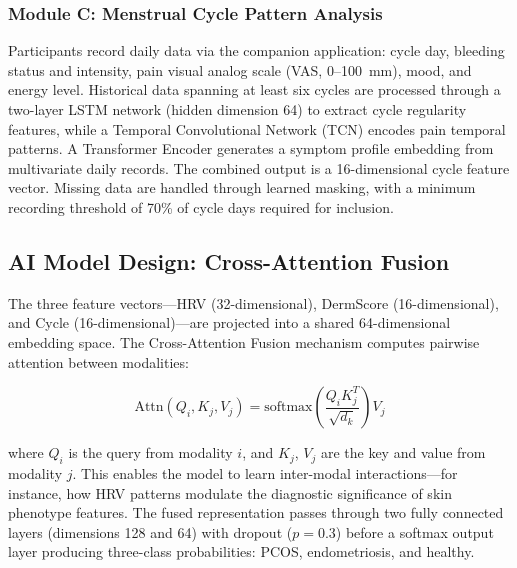 \documentclass[conference]{IEEEtran}
\begin{document}
\subsubsection{Module C: Menstrual Cycle Pattern Analysis}
Participants record daily data via the companion application: cycle day, bleeding status and intensity, pain visual analog scale (VAS, 0--100~mm), mood, and energy level. Historical data spanning at least six cycles are processed through a two-layer LSTM network (hidden dimension 64) to extract cycle regularity features, while a Temporal Convolutional Network (TCN) encodes pain temporal patterns. A Transformer Encoder generates a symptom profile embedding from multivariate daily records. The combined output is a 16-dimensional cycle feature vector. Missing data are handled through learned masking, with a minimum recording threshold of 70\% of cycle days required for inclusion.

\subsection{AI Model Design: Cross-Attention Fusion}

The three feature vectors---HRV (32-dimensional), DermScore (16-dimensional), and Cycle (16-dimensional)---are projected into a shared 64-dimensional embedding space. The Cross-Attention Fusion mechanism computes pairwise attention between modalities:

\begin{equation}
\text{Attn}(Q_i, K_j, V_j) = \text{softmax}\left(\frac{Q_i K_j^T}{\sqrt{d_k}}\right) V_j
\end{equation}

\noindent where $Q_i$ is the query from modality $i$, and $K_j$, $V_j$ are the key and value from modality $j$. This enables the model to learn inter-modal interactions---for instance, how HRV patterns modulate the diagnostic significance of skin phenotype features. The fused representation passes through two fully connected layers (dimensions 128 and 64) with dropout ($p = 0.3$) before a softmax output layer producing three-class probabilities: PCOS, endometriosis, and healthy.
\end{document}
